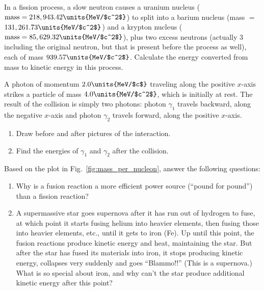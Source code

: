 \begin{problem}
  In a fission process, a slow neutron causes a uranium nucleus
  ($\text{mass} = 218,943.42\units{MeV/$c^2$}$) to split into a barium
  nucleus (mass $=$\break $131,261.73\units{MeV/$c^2$}$) and a krypton
  nucleus ($\text{mass} = 85,629.32\units{MeV/$c^2$}$), plus two
  excess neutrons (actually 3 including the original neutron, but that
  is present before the process as well), each of mass
  $939.57\units{MeV/$c^2$}$.  Calculate the energy converted from mass
  to kinetic energy in this process.
\end{problem}



\begin{problem}
  A photon of momentum $2.0\units{MeV/$c$}$ traveling along the
  positive $x$-axis strikes a particle of mass $4.0\units{MeV/$c^2$}$,
  which is initially at rest.  The result of the collision is simply
  two photons: photon $\gamma_1$ travels backward, along the negative
  $x$-axis and photon $\gamma_2$ travels forward, along the positive
  $x$-axis.
  \begin{enumerate}
  \item Draw before and after pictures of the interaction.
  \item Find the energies of $\gamma_1$ and $\gamma_2$ after the
    collision.
  \end{enumerate}
\end{problem}

\begin{problem}
  Based on the plot in Fig.~\ref{fig:mass_per_nucleon}, answer the
  following questions:
  \begin{enumerate}
  \item Why is a fusion reaction a more efficient power source
    (``pound for pound'') than a fission reaction?
  \item A supermassive star goes supernova after it has run out of
    hydrogen to fuse, at which point it starts fusing helium into
    heavier elements, then fusing those into heavier elements, etc.,
    until it gets to iron (Fe).  Up until this point, the fusion
    reactions produce kinetic energy and heat, maintaining the star.
    But after the star has fused its materials into iron, it stops
    producing kinetic energy, collapses very suddenly and goes
    ``Blammo!!''  (This is a supernova.)  What is so special about
    iron, and why can't the star produce additional kinetic energy
    after this point?
  \end{enumerate}
\end{problem}

